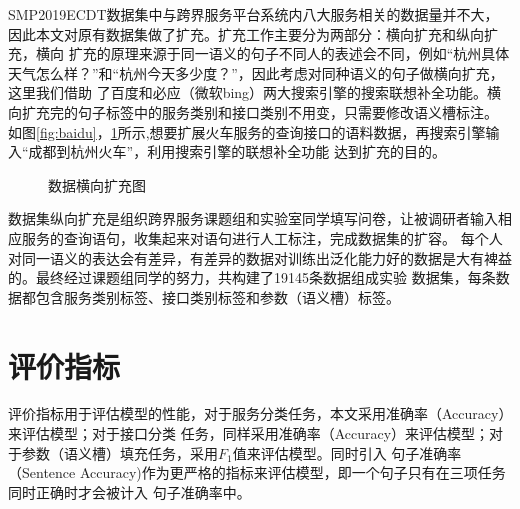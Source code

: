 SMP2019ECDT数据集中与跨界服务平台系统内八大服务相关的数据量并不大，因此本文对原有数据集做了扩充。扩充工作主要分为两部分：横向扩充和纵向扩充，横向
扩充的原理来源于同一语义的句子不同人的表述会不同，例如“杭州具体天气怎么样？”和“杭州今天多少度？”，因此考虑对同种语义的句子做横向扩充，这里我们借助
了百度和必应（微软bing）两大搜索引擎的搜索联想补全功能。横向扩充完的句子标签中的服务类别和接口类别不用变，只需要修改语义槽标注。
如图\ref{fig:baidu}，\ref{fig:bing}所示,想要扩展火车服务的查询接口的语料数据，再搜索引擎输入“成都到杭州火车”，利用搜索引擎的联想补全功能
达到扩充的目的。


  \begin{figure}[htbp]
    \caption{数据横向扩充图}
    \label{fig:bing}
    \end{figure}

数据集纵向扩充是组织跨界服务课题组和实验室同学填写问卷，让被调研者输入相应服务的查询语句，收集起来对语句进行人工标注，完成数据集的扩容。
每个人对同一语义的表达会有差异，有差异的数据对训练出泛化能力好的数据是大有裨益的。最终经过课题组同学的努力，共构建了19145条数据组成实验
数据集，每条数据都包含服务类别标签、接口类别标签和参数（语义槽）标签。


\section{评价指标}
评价指标用于评估模型的性能，对于服务分类任务，本文采用准确率（Accuracy）来评估模型；对于接口分类
任务，同样采用准确率（Accuracy）来评估模型；对于参数（语义槽）填充任务，采用$F_1$值来评估模型。同时引入
句子准确率（Sentence Accuracy)作为更严格的指标来评估模型，即一个句子只有在三项任务同时正确时才会被计入
句子准确率中。


